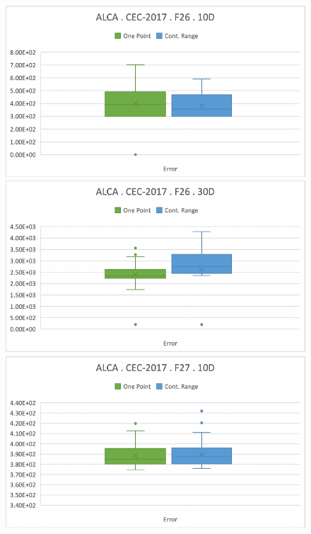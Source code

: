 \documentclass[graybox]{svmult}
\begin{document}
    \begin{figure}[!ht]
        \begin{minipage}[h]{0.49\linewidth}
            \includegraphics[width=1\linewidth]{img/fig_experiment_F26x10D.pdf} 
        \end{minipage}
        \hfill
        \begin{minipage}[h]{0.49\linewidth}
            \includegraphics[width=1\linewidth]{img/fig_experiment_F26x30D.pdf} 
        \end{minipage}
        \vfill
        \vspace{0.05 cm}
        \begin{minipage}[h]{0.49\linewidth}
            \includegraphics[width=1\linewidth]{img/fig_experiment_F27x10D.pdf} 

\end{minipage}
\end{figure}
\end{document}
